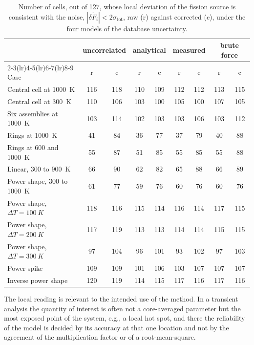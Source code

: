 \begin{table}[htbp]
  \centering
  \caption[Cells consistent with the noise]{Number of cells, out of 127, whose
  local deviation of the fission source is consistent with the noise,
  $|\delta\tilde F_i| < 2\sigma_{\mathrm{tot}}$, raw (r) against corrected (c),
  under the four models of the database uncertainty.}
  \label{cr:tab:zones}
  \footnotesize
  \begin{tabular}{lcccccccc}
    \toprule
    & \multicolumn{2}{c}{uncorrelated} & \multicolumn{2}{c}{analytical}
    & \multicolumn{2}{c}{measured} & \multicolumn{2}{c}{brute force} \\
    \cmidrule(lr){2-3}\cmidrule(lr){4-5}\cmidrule(lr){6-7}\cmidrule(lr){8-9}
    Case & r & c & r & c & r & c & r & c \\
    \midrule
    Central cell at \SI{1000}{K}        & 116 & 118 & 110 & 109 & 112 & 112 & 113 & 115 \\
    Central cell at \SI{300}{K}         & 110 & 106 & 103 & 100 & 105 & 100 & 107 & 105 \\
    Six assemblies at \SI{1000}{K}      & 103 & 114 & 102 & 103 & 103 & 106 & 103 & 112 \\
    Rings at \SI{1000}{K}               &  41 &  84 &  36 &  77 &  37 &  79 &  40 &  88 \\
    Rings at 600 and \SI{1000}{K}       &  55 &  87 &  51 &  85 &  55 &  85 &  55 &  88 \\
    Linear, 300 to \SI{900}{K}          &  66 &  90 &  62 &  82 &  65 &  88 &  66 &  89 \\
    Power shape, 300 to \SI{1000}{K}    &  61 &  77 &  59 &  76 &  60 &  76 &  60 &  76 \\
    Power shape, $\Delta T=\SI{100}{K}$ & 118 & 116 & 115 & 114 & 116 & 114 & 117 & 115 \\
    Power shape, $\Delta T=\SI{200}{K}$ & 117 & 119 & 113 & 113 & 114 & 114 & 115 & 115 \\
    Power shape, $\Delta T=\SI{300}{K}$ &  97 & 104 &  96 & 101 &  93 & 102 &  97 & 103 \\
    Power spike                         & 109 & 109 & 101 & 106 & 103 & 107 & 107 & 107 \\
    Inverse power shape                 & 120 & 119 & 114 & 115 & 117 & 116 & 117 & 116 \\
    \bottomrule
  \end{tabular}
\end{table}

The local reading is relevant to the intended use of the method. In a
transient analysis the quantity of interest is often not a core-averaged
parameter but the most exposed point of the system, e.g., a local hot spot, and there
the reliability of the model is decided by its accuracy at that one location
and not by the agreement of the multiplication factor or of a
root-mean-square.

